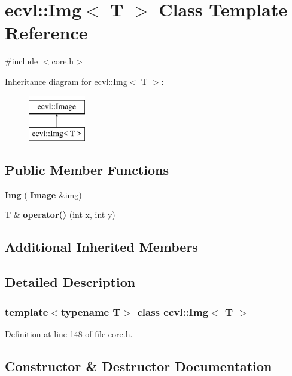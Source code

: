 \section{ecvl\+::Img$<$ T $>$ Class Template Reference}
\label{classecvl_1_1_img}


{\ttfamily \#include $<$core.\+h$>$}

Inheritance diagram for ecvl\+::Img$<$ T $>$\+:\begin{figure}[H]
\begin{center}
\leavevmode
\includegraphics[height=2.000000cm]{classecvl_1_1_img}
\end{center}
\end{figure}
\subsection*{Public Member Functions}
\begin{DoxyCompactItemize}
\item 
\textbf{ Img} (\textbf{ Image} \&img)
\item 
T \& \textbf{ operator()} (int x, int y)
\end{DoxyCompactItemize}
\subsection*{Additional Inherited Members}


\subsection{Detailed Description}
\subsubsection*{template$<$typename T$>$\newline
class ecvl\+::\+Img$<$ T $>$}



Definition at line 148 of file core.\+h.



\subsection{Constructor \& Destructor Documentation}
\mbox{\label{classecvl_1_1_img_ad9378aac3f1a5dca5883e8cb75a9bd67}} 
